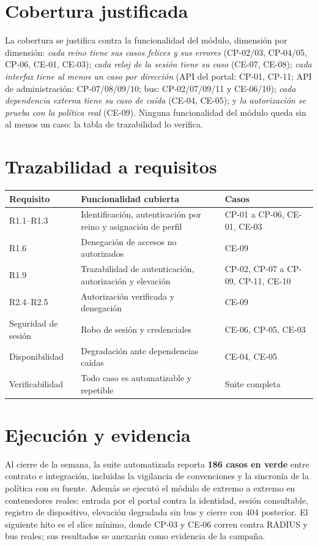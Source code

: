 \documentclass[11pt,a4paper]{article}
\begin{document}
\section{Cobertura justificada}

La cobertura se justifica contra la funcionalidad del módulo, dimensión por dimensión: \emph{cada reino tiene sus casos felices y sus errores} (CP-02/03, CP-04/05, CP-06, CE-01, CE-03); \emph{cada reloj de la sesión tiene su caso} (CE-07, CE-08); \emph{cada interfaz tiene al menos un caso por dirección} (API del portal: CP-01, CP-11; API de administración: CP-07/08/09/10; bus: CP-02/07/09/11 y CE-06/10); \emph{cada dependencia externa tiene su caso de caída} (CE-04, CE-05); y \emph{la autorización se prueba con la política real} (CE-09). Ninguna funcionalidad del módulo queda sin al menos un caso: la tabla de trazabilidad lo verifica.

\section{Trazabilidad a requisitos}

\begin{longtable}{p{2.6cm}p{6.0cm}p{5.4cm}}
\toprule
\textbf{Requisito} & \textbf{Funcionalidad cubierta} & \textbf{Casos}\\
\midrule
R1.1--R1.3 & Identificación, autenticación por reino y asignación de perfil & CP-01 a CP-06, CE-01, CE-03\\
R1.6 & Denegación de accesos no autorizados & CE-09\\
R1.9 & Trazabilidad de autenticación, autorización y elevación & CP-02, CP-07 a CP-09, CP-11, CE-10\\
R2.4--R2.5 & Autorización verificada y denegación & CE-09\\
Seguridad de sesión & Robo de sesión y credenciales & CE-06, CP-05, CE-03\\
Disponibilidad & Degradación ante dependencias caídas & CE-04, CE-05\\
Verificabilidad & Todo caso es automatizable y repetible & Suite completa\\
\bottomrule
\end{longtable}

\section{Ejecución y evidencia}

Al cierre de la semana, la suite automatizada reporta \textbf{186 casos en verde} entre contrato e integración, incluidas la vigilancia de convenciones y la sincronía de la política con su fuente. Además se ejecutó el módulo de extremo a extremo en contenedores reales: entrada por el portal contra la identidad, sesión consultable, registro de dispositivo, elevación degradada sin bus y cierre con 404 posterior. El siguiente hito es el slice mínimo, donde CP-03 y CE-06 corren contra RADIUS y bus reales; sus resultados se anexarán como evidencia de la campaña.
\end{document}
